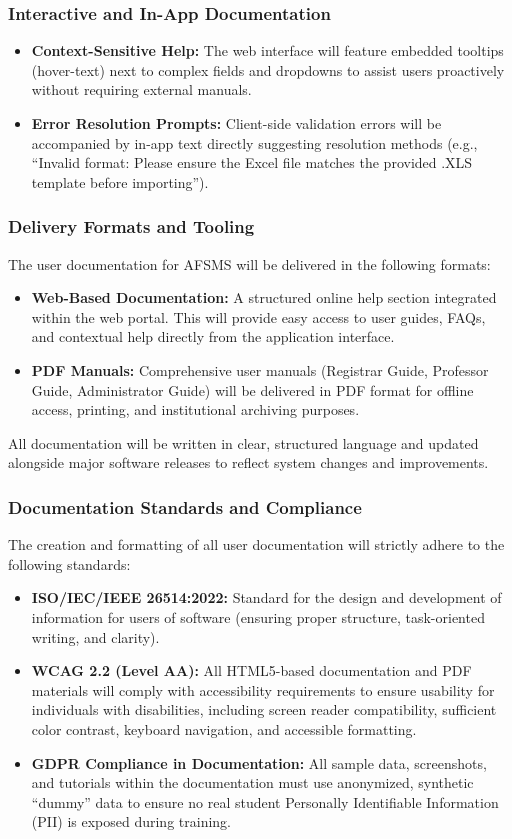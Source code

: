 \documentclass[11pt, a4paper]{article}
\begin{document}
\subsubsection{Interactive and In-App Documentation}
\begin{itemize}
    \item \textbf{Context-Sensitive Help:} The web interface will feature embedded tooltips (hover-text) next to complex fields and dropdowns to assist users proactively without requiring external manuals.
    \item \textbf{Error Resolution Prompts:} Client-side validation errors will be accompanied by in-app text directly suggesting resolution methods (e.g., ``Invalid format: Please ensure the Excel file matches the provided .XLS template before importing'').
\end{itemize}

\subsubsection{Delivery Formats and Tooling}
The user documentation for AFSMS will be delivered in the following formats:
\begin{itemize}
    \item \textbf{Web-Based Documentation:} A structured online help section integrated within the web portal. This will provide easy access to user guides, FAQs, and contextual help directly from the application interface.
    \item \textbf{PDF Manuals:} Comprehensive user manuals (Registrar Guide, Professor Guide, Administrator Guide) will be delivered in PDF format for offline access, printing, and institutional archiving purposes.
\end{itemize}
All documentation will be written in clear, structured language and updated alongside major software releases to reflect system changes and improvements.

\subsubsection{Documentation Standards and Compliance}
The creation and formatting of all user documentation will strictly adhere to the following standards:
\begin{itemize}
    \item \textbf{ISO/IEC/IEEE 26514:2022:} Standard for the design and development of information for users of software (ensuring proper structure, task-oriented writing, and clarity).
    \item \textbf{WCAG 2.2 (Level AA):} All HTML5-based documentation and PDF materials will comply with accessibility requirements to ensure usability for individuals with disabilities, including screen reader compatibility, sufficient color contrast, keyboard navigation, and accessible formatting.
    \item \textbf{GDPR Compliance in Documentation:} All sample data, screenshots, and tutorials within the documentation must use anonymized, synthetic ``dummy'' data to ensure no real student Personally Identifiable Information (PII) is exposed during training.
\end{itemize}
\end{document}
